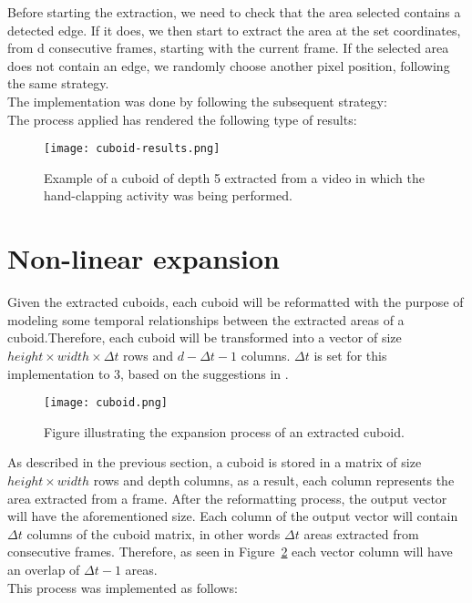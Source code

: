 \documentclass[11pt]{report}
\begin{document}

Before starting the extraction, we need to check that the area selected contains a detected edge. If it does, we then start to extract the area at the set coordinates, from d consecutive frames, starting with the current frame. If the selected area does not contain an edge, we randomly choose another pixel position, following the same strategy.\\
The implementation was done by following the subsequent strategy:\\


The process applied has rendered the following type of results:\\
\begin{figure}
    \centering
    \texttt{[image: cuboid-results.png]}
    \caption{Example of a cuboid of depth 5 extracted from a video in which the hand-clapping activity was being performed.}
    \label{fig:cuboid-results}
\end{figure}

\section{Non-linear expansion}
Given the extracted cuboids, each cuboid will be reformatted with the purpose of modeling some temporal relationships between the extracted areas of a cuboid.Therefore, each cuboid will be transformed into a vector of size \( height \times width \times \Delta t\) rows and  \(d - \Delta t - 1\) columns. \(\Delta t\) is set for this implementation to 3, based on the suggestions in \cite{main}. \\

\begin{figure}
    \centering
    \texttt{[image: cuboid.png]}
    \caption{Figure illustrating the expansion process of an extracted cuboid.}
    \label{fig:cuboid}
\end{figure}

As described in the previous section, a cuboid is stored in a matrix of size \(height \times width\) rows and depth columns, as a result, each column represents the area extracted from a frame. After the reformatting process, the output vector will have the aforementioned size. Each column of the output vector will contain \( \Delta t\) columns of the cuboid matrix, in other words \( \Delta t\) areas extracted from consecutive frames. Therefore, as seen in Figure~\ref{fig:cuboid} each vector column will have an overlap of \( \Delta t - 1\) areas. \\
This process was implemented as follows:
\end{document}
